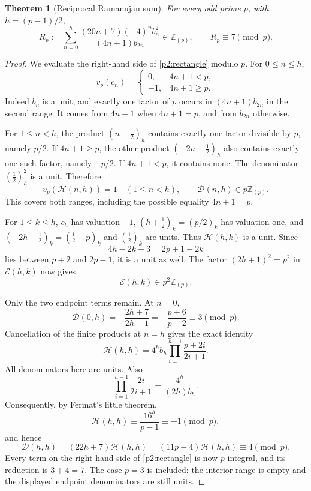 \documentclass[11pt,a4paper]{article}
\newtheorem{theorem}{Theorem}[section]
\theoremstyle{remark}\newtheorem{remark}[theorem]{Remark}
\newcommand{\Z}{\mathbb Z}\newcommand{\Q}{\mathbb Q}
\begin{document}
\begin{theorem}[Reciprocal Ramanujan sum]\label{p2:reciprocal}
For every odd prime \(p\), with \(h=(p-1)/2\),
\[
 R_p:=\sum_{n=0}^h
       \frac{(20n+7)(-4)^n b_n^2}{(4n+1)b_{2n}}
       \in\Z_{(p)},\qquad R_p\equiv7\pmod p.
\]
\end{theorem}
\begin{proof}
We evaluate the right-hand side of \eqref{p2:rectangle} modulo \(p\).
For \(0\le n\le h\),
\[
 v_p(c_n)=
 \begin{cases}
 0,&4n+1<p,\\
 -1,&4n+1\ge p.
 \end{cases}
\]
Indeed \(b_n\) is a unit, and exactly one factor of \(p\) occurs
in \((4n+1)b_{2n}\) in the second range. It comes from \(4n+1\)
when \(4n+1=p\), and from \(b_{2n}\) otherwise.

For \(1\le n<h\), the product \((n+\tfrac12)_h\) contains
exactly one factor divisible by \(p\), namely \(p/2\).
If \(4n+1\ge p\), the other product
\((-2n-\tfrac12)_h\) also contains exactly one such factor,
namely \(-p/2\). If \(4n+1<p\), it contains none.
The denominator \((\tfrac12)_h^2\) is a unit. Therefore
\[
 v_p(\mathcal H(n,h))=1\quad(1\le n<h),
 \qquad \mathcal D(n,h)\in p\Z_{(p)}.
\]
This covers both ranges, including the possible equality \(4n+1=p\).

For \(1\le k\le h\), \(c_h\) has valuation \(-1\),
\((h+\tfrac12)_k=(p/2)_k\) has valuation one, and
\((-2h-\tfrac12)_k=(\tfrac12-p)_k\) and \((\tfrac12)_k\)
are units. Thus \(\mathcal H(h,k)\) is a unit. Since
\[
 4h-2k+3=2p+1-2k
\]
lies between \(p+2\) and \(2p-1\), it is a unit as well.
The factor \((2h+1)^2=p^2\) in \(\mathcal E(h,k)\) now gives
\[
                   \mathcal E(h,k)\in p^2\Z_{(p)}.
\]

Only the two endpoint terms remain. At \(n=0\),
\[
 \mathcal D(0,h)=-\frac{2h+7}{2h-1}
                   =-\frac{p+6}{p-2}\equiv3\pmod p.
\]
Cancellation of the finite products at \(n=h\) gives the exact identity
\[
 \mathcal H(h,h)=4^h b_h
                 \prod_{i=1}^{h-1}\frac{p+2i}{2i+1}.
\]
All denominators here are units. Also
\[
 \prod_{i=1}^{h-1}\frac{2i}{2i+1}
                        =\frac{4^h}{(2h)b_h}.
\]
Consequently, by Fermat's little theorem,
\[
 \mathcal H(h,h)\equiv\frac{16^h}{p-1}\equiv-1\pmod p,
\]
and hence
\[
 \mathcal D(h,h)=(22h+7)\mathcal H(h,h)
                 =(11p-4)\mathcal H(h,h)\equiv4\pmod p.
\]
Every term on the right-hand side of \eqref{p2:rectangle} is now
\(p\)-integral, and its reduction is \(3+4=7\).
The case \(p=3\) is included: the interior range is empty and
the displayed endpoint denominators are still units.
\end{proof}
\end{document}
